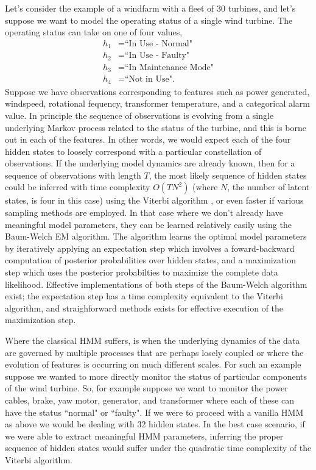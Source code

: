 \documentclass{article}
\begin{document}
Let's consider the example of a windfarm with a fleet of 30 turbines, and let's suppose we want to model the operating status of a single wind turbine. The operating status can take on one of four values, 
\begin{align*}
h_1&=\text{``In Use - Normal"}\\
h_2&=\text{``In Use - Faulty"}\\ 
h_3&=\text{``In Maintenance Mode"}\\
h_4&=\text{``Not in Use".}  
\end{align*}
Suppose we have observations corresponding to features such as power generated, windspeed, rotational fequency, transformer temperature, and a categorical alarm value.  In principle the sequence of observations is evolving from a single underlying Markov process related to the status of the turbine, and this is borne out in each of the features.  In other words, we would expect each of the four hidden states to loosely correspond with a particular constellation of observations. If the underlying model dynamics are already known, then for a sequence of observations with length $T$, the most likely sequence of hidden states could be inferred with time complexity $O(TN^2)$ (where $N$, the number of latent states, is four in this case) using the Viterbi algorithm \cite{V67}, or even faster if various sampling methods are employed.  In that case where we don't already have meaningful model parameters, they can be learned relatively easily using the Baum-Welch EM algorithm.  The algorithm learns the optimal model parameters by iteratively applying an expectation step which involves a foward-backward computation of posterior probabilities over hidden states, and a maximization step which uses the posterior probabilties to maximize the complete data likelihood.  Effective implementations of both steps of the Baum-Welch algorithm exist; the expectation step has a time complexity equivalent to the Viterbi algorithm, and straighforward methods exists for effective execution of the maximization step.                    

Where the classical HMM suffers, is when the underlying dynamics of the data are governed by multiple processes that are perhaps losely coupled or where the evolution of features is occurring on much different scales.  For such an example suppose we wanted to more directly monitor the status of particular components of the wind turbine.  So, for example suppose we want to monitor the power cables, brake, yaw motor, generator, and transformer where each of these can have the status ``normal" or ``faulty".  If we were to proceed with a vanilla HMM as above we would be dealing with 32 hidden states.  In the best case scenario, if we were able to extract meaningful HMM parameters, inferring the proper sequence of hidden states would suffer under the quadratic time complexity of the Viterbi algorithm.  
\end{document}
